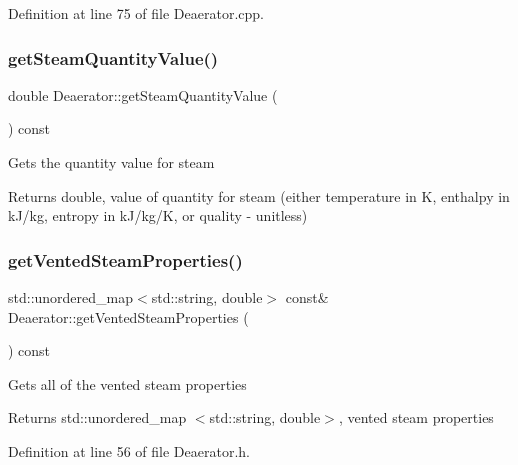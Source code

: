 Definition at line 75 of file Deaerator.\+cpp.

\mbox{\label{class_deaerator_a5473feedca64e7c44143d422ed3e2401}} 
\subsubsection{\texorpdfstring{get\+Steam\+Quantity\+Value()}{getSteamQuantityValue()}\hspace{0.1cm}{\footnotesize\ttfamily [3/3]}}
{\footnotesize\ttfamily double Deaerator\+::get\+Steam\+Quantity\+Value (\begin{DoxyParamCaption}{ }\end{DoxyParamCaption}) const}

Gets the quantity value for steam \begin{DoxyReturn}{Returns}
double, value of quantity for steam (either temperature in K, enthalpy in k\+J/kg, entropy in k\+J/kg/K, or quality -\/ unitless) 
\end{DoxyReturn}
\mbox{\label{class_deaerator_aba77ebc41e5b05d6e2463793bacbcbc0}} 
\subsubsection{\texorpdfstring{get\+Vented\+Steam\+Properties()}{getVentedSteamProperties()}\hspace{0.1cm}{\footnotesize\ttfamily [1/3]}}
{\footnotesize\ttfamily std\+::unordered\+\_\+map$<$std\+::string, double$>$ const\& Deaerator\+::get\+Vented\+Steam\+Properties (\begin{DoxyParamCaption}{ }\end{DoxyParamCaption}) const\hspace{0.3cm}{\ttfamily [inline]}}

Gets all of the vented steam properties \begin{DoxyReturn}{Returns}
std\+::unordered\+\_\+map $<$std\+::string, double$>$, vented steam properties 
\end{DoxyReturn}


Definition at line 56 of file Deaerator.\+h.

